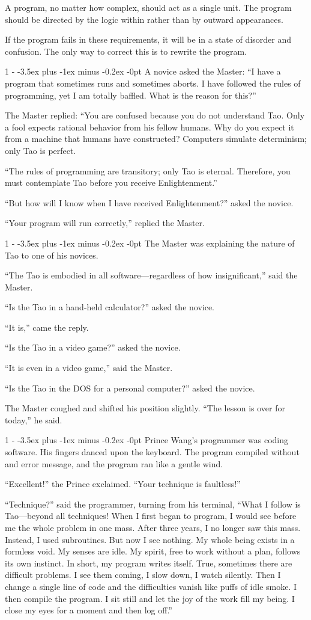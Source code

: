 \documentclass[12pt,letterpaper,titlepage]{article}
\makeatletter
\newlength{\intomargin}\setlength{\intomargin}{25pt}
\renewcommand{\subsection}{%
\@startsection{subsection}%
{1}%
{-\intomargin}%
{-3.5ex plus -1ex minus -0.2ex}%
{-0pt}%
{\normalfont\normalsize\bfseries\color{my-red}}%
}
\newcommand{\sect}{\subsection{}}
\makeatother
\begin{document}
A program, no matter how complex, should act as a single unit. The
program should be directed by the logic within rather than by outward
appearances.

If the program fails in these requirements, it will be in a state of
disorder and confusion. The only way to correct this is to rewrite the
program.

\sect
A novice asked the Master: ``I have a program that sometimes runs and
sometimes aborts. I have followed the rules of programming, yet I am
totally baffled. What is the reason for this?''

The Master replied: ``You are confused because you do not understand
Tao. Only a fool expects rational behavior from his fellow humans. Why
do you expect it from a machine that humans have constructed?
Computers simulate determinism; only Tao is perfect.

``The rules of programming are transitory; only Tao is
eternal. Therefore, you must contemplate Tao before you receive
Enlightenment.''

``But how will I know when I have received Enlightenment?'' asked the
novice.

``Your program will run correctly,'' replied the Master.

\sect
The Master was explaining the nature of Tao to one of his novices.

``The Tao is embodied in all software---regardless of how
insignificant,'' said the Master.

``Is the Tao in a hand-held calculator?'' asked the novice.

``It is,'' came the reply.

``Is the Tao in a video game?'' asked the novice.

``It is even in a video game,'' said the Master.

``Is the Tao in the {\small DOS} for a personal computer?'' asked the novice.

The Master coughed and shifted his position slightly. ``The lesson is
over for today,'' he said.

\sect
Prince Wang's programmer was coding software. His fingers danced upon
the keyboard. The program compiled without and error message, and the
program ran like a gentle wind.

``Excellent!'' the Prince exclaimed. ``Your technique is faultless!''

``Technique?'' said the programmer, turning from his terminal, ``What
I follow is Tao---beyond all techniques! When I first began to
program, I would see before me the whole problem in one mass. After
three years, I no longer saw this mass. Instead, I used
subroutines. But now I see nothing. My whole being exists in a
formless void. My senses are idle. My spirit, free to work without a
plan, follows its own instinct. In short, my program writes
itself. True, sometimes there are difficult problems. I see them
coming, I slow down, I watch silently. Then I change a single line of
code and the difficulties vanish like puffs of idle smoke. I then
compile the program. I sit still and let the joy of the work fill my
being. I close my eyes for a moment and then log off.''
\end{document}
